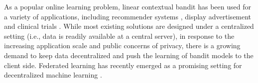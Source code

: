 As a popular online learning problem, linear contextual bandit has been used for a variety of applications, including recommender systems \citep{li2010contextual}, display advertisement \citep{li2010exploitation} and clinical trials \citep{durand2018contextual}. While most existing solutions are designed under a centralized setting (i.e., data is readily available at a central server), in response to the increasing application scale and public concerns of privacy, there is a growing demand to keep data decentralized and push the learning of bandit models to the client side.
Federated learning has recently emerged as a promising setting for decentralized machine learning \citep{konevcny2016federated}.
